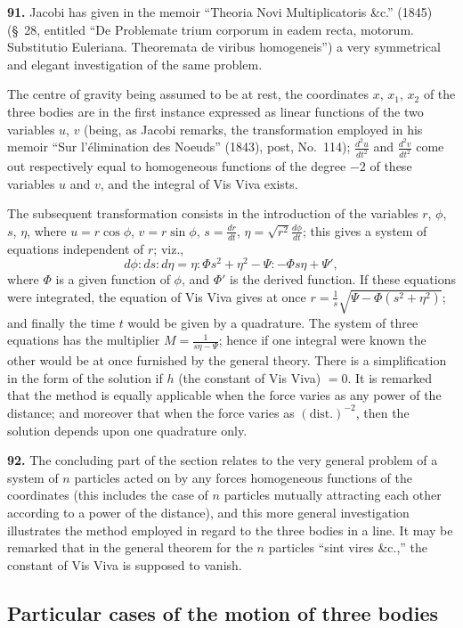 \documentclass[11pt,a4paper]{article}
\theoremstyle{definition}
\begin{document}
\textbf{91.} Jacobi has given in the memoir ``Theoria Novi Multiplicatoris \&c.'' (1845) (\S~28, entitled ``De Problemate trium corporum in eadem recta, motorum. Substitutio Euleriana. Theoremata de viribus homogeneis'') a very symmetrical and elegant investigation of the same problem.

The centre of gravity being assumed to be at rest, the coordinates $x$, $x_1$, $x_2$ of the three bodies are in the first instance expressed as linear functions of the two variables $u$, $v$ (being, as Jacobi remarks, the transformation employed in his memoir ``Sur l'\'elimination des Noeuds'' (1843), post, No.~114); $\frac{d^2u}{dt^2}$ and $\frac{d^2v}{dt^2}$ come out respectively equal to homogeneous functions of the degree $-2$ of these variables $u$ and $v$, and the integral of Vis Viva exists.

The subsequent transformation consists in the introduction of the variables $r$, $\phi$, $s$, $\eta$, where $u = r\cos\phi$, $v = r\sin\phi$, $s = \frac{dr}{dt}$, $\eta = \sqrt{r^2}\frac{d\phi}{dt}$; this gives a system of equations independent of $r$; viz.,
\[
d\phi : ds : d\eta = \eta : \Phi s^2 + \eta^2 - \Psi : -\Phi s\eta + \Psi',
\]
where $\Phi$ is a given function of $\phi$, and $\Phi'$ is the derived function. If these equations were integrated, the equation of Vis Viva gives at once $r = \frac{1}{s}\sqrt{\Psi - \Phi(s^2 + \eta^2)}$; and finally the time $t$ would be given by a quadrature. The system of three equations has the multiplier $M = \frac{1}{s\eta - \Psi}$; hence if one integral were known the other would be at once furnished by the general theory. There is a simplification in the form of the solution if $h$ (the constant of Vis Viva) $= 0$. It is remarked that the method is equally applicable when the force varies as any power of the distance; and moreover that when the force varies as $(\text{dist.})^{-2}$, then the solution depends upon one quadrature only.

\textbf{92.} The concluding part of the section relates to the very general problem of a system of $n$ particles acted on by any forces homogeneous functions of the coordinates (this includes the case of $n$ particles mutually attracting each other according to a power of the distance), and this more general investigation illustrates the method employed in regard to the three bodies in a line. It may be remarked that in the general theorem for the $n$ particles ``sint vires \&c.,'' the constant of Vis Viva is supposed to vanish.

\subsection*{Particular cases of the motion of three bodies}
\end{document}
